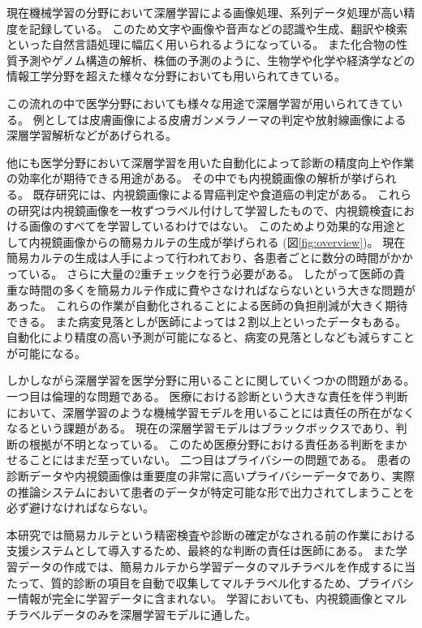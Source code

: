 現在機械学習の分野において深層学習による画像処理\cite{CNN,AlexNet,VGG,ResNet}、系列データ処理\cite{RNN,GRU,LSTM,Transformer}が高い精度を記録している。
このため文字や画像や音声などの認識\cite{DL_LVCSR,ImageNet}や生成\cite{GAN,VAE}、翻訳\cite{Transformer,Seq2Seq,effective_attention}や検索\cite{anxious_learning}といった自然言語処理に幅広く用いられるようになっている。
また化合物の性質予測\cite{Chemistry1,Chemistry2}やゲノム構造の解析\cite{Genomics}、株価の予測\cite{stock_prediction1,stock_prediction2}のように、生物学や化学や経済学などの情報工学分野を超えた様々な分野においても用いられてきている。

この流れの中で医学分野においても様々な用途で深層学習が用いられてきている。
例としては皮膚画像による皮膚ガンメラノーマの判定\cite{skin_cancer_melanoma}や放射線画像による深層学習解析\cite{radiology}などがあげられる。

他にも医学分野において深層学習を用いた自動化によって診断の精度向上や作業の効率化が期待できる用途がある。
その中でも内視鏡画像の解析が挙げられる。
既存研究には、内視鏡画像による胃癌判定\cite{stomach_cancer}や食道癌\cite{esophageal_cancer}の判定がある。
これらの研究は内視鏡画像を一枚ずつラベル付けして学習したもので、内視鏡検査における画像のすべてを学習しているわけではない。
このためより効果的な用途として内視鏡画像からの簡易カルテの生成が挙げられる (図\ref{fig:overview})。
現在簡易カルテの生成は人手によって行われており、各患者ごとに数分の時間がかかっている。
さらに大量の2重チェックを行う必要がある。
したがって医師の貴重な時間の多くを簡易カルテ作成に費やさなければならないという大きな問題があった。
これらの作業が自動化されることによる医師の負担削減が大きく期待できる。
また病変見落としが医師によっては２割以上といったデータ\cite{medical_problem2}もある。
自動化により精度の高い予測が可能になると、病変の見落としなども減らすことが可能になる。

しかしながら深層学習を医学分野に用いることに関していくつかの問題がある。
一つ目は倫理的な問題である。
医療における診断という大きな責任を伴う判断において、深層学習のような機械学習モデルを用いることには責任の所在がなくなるという課題がある。
現在の深層学習モデルはブラックボックスであり、判断の根拠が不明となっている。
このため医療分野における責任ある判断をまかせることにはまだ至っていない。
二つ目はプライバシーの問題である。
患者の診断データや内視鏡画像は重要度の非常に高いプライバシーデータであり、実際の推論システムにおいて患者のデータが特定可能な形で出力されてしまうことを必ず避けなければならない。

本研究では簡易カルテという精密検査や診断の確定がなされる前の作業における支援システムとして導入するため、最終的な判断の責任は医師にある。
また学習データの作成では、簡易カルテから学習データのマルチラベルを作成するに当たって、質的診断の項目を自動で収集してマルチラベル化するため、プライバシー情報が完全に学習データに含まれない。
学習においても、内視鏡画像とマルチラベルデータのみを深層学習モデルに通した。

